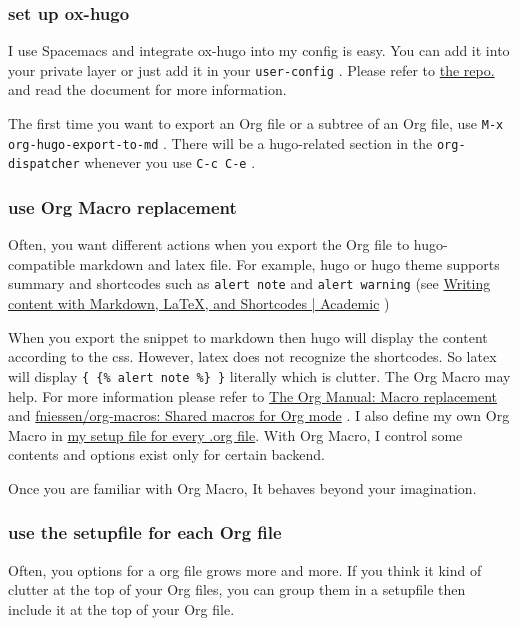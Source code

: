 \documentclass[koma,a4paper,captions=tableheading,11pt,listings-sv,microtype,paralist,colorlinks=true,urlcolor=blue,palatino]{org-article}
\begin{document}
\subsubsection{set up ox-hugo}
\label{sec:org11a7de8}


I use Spacemacs and integrate ox-hugo into my config is easy. You can add it
into your private layer or just add it in your \texttt{user-config} . Please refer to
\href{https://github.com/kaushalmodi/ox-hugo}{the repo.} and read the document for more information.

The first time you want to export an Org file or a subtree of an Org file, use
\texttt{M-x org-hugo-export-to-md} . There will be a hugo-related section in the
\texttt{org-dispatcher} whenever you use \texttt{C-c C-e} .
\subsubsection{use Org Macro replacement}
\label{sec:orgf79a086}


Often, you want different actions when you export the Org file to
hugo-compatible markdown and latex file. For example, hugo or hugo theme supports
summary and shortcodes such as \texttt{alert note} and \texttt{alert warning} (see  \href{https://sourcethemes.com/academic/docs/writing-markdown-latex/}{Writing
content with Markdown, \LaTeX{}, and Shortcodes | Academic} )

When you export the snippet to markdown then hugo will display the content
according to the css. However, latex does not recognize the shortcodes. So latex
will display \texttt{\{ \{\% alert note \%\} \}} literally which is clutter. The Org Macro may
help. For more information please refer to \href{https://orgmode.org/manual/Macro-replacement.html}{The Org Manual: Macro replacement} and
\href{https://github.com/fniessen/org-macros}{fniessen/org-macros: Shared macros for Org mode} . I also define my own Org Macro
in \href{https://github.com/msteamc/.spacemacs.d/blob/master/org-templates/enpost.org}{my setup file for every .org file}. With Org Macro, I control some contents
and options exist only for certain backend.

Once you are familiar with Org Macro, It behaves beyond your imagination.
\subsubsection{use the setupfile for each Org file}
\label{sec:org66edc24}


Often, you options for a org file grows more and more. If you think it kind of
clutter at the top of your Org files, you can group them in a setupfile then
include it at the top of your Org file.
\end{document}

